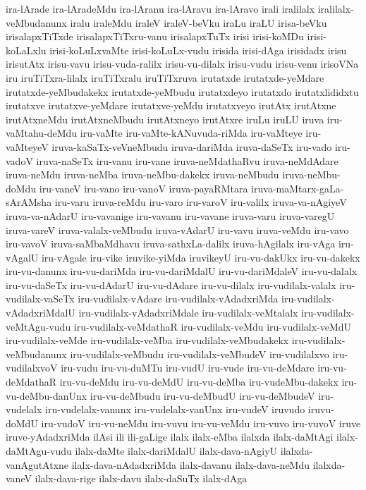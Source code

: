 {ira-lArade
ira-lAradeMdu
ira-lAranu
ira-lAravu
ira-lAravo
irali
iralilalx
iralilalx-veMbudanunx
iralu
iraleMdu
iraleV
iraleV-beVku
iraLu
iraLU
irisa-beVku
irisalapxTiTxde
irisalapxTiTxru-vanu
irisalapxTuTx
irisi
irisi-koMDu
irisi-koLaLxlu
irisi-koLuLxvaMte
irisi-koLuLx-vudu
irisida
irisi-dAga
irisidadx
irisu
irisutAtx
irisu-vavu
irisu-vuda-ralilx
irisu-vu-dilalx
irisu-vudu
irisu-venu
irisoVNa
iru
iruTiTxra-lilalx
iruTiTxralu
iruTiTxruva
irutatxde
irutatxde-yeMdare
irutatxde-yeMbudakekx
irutatxde-yeMbudu
irutatxdeyo
irutatxdo
irutatxlididxtu
irutatxve
irutatxve-yeMdare
irutatxve-yeMdu
irutatxveyo
irutAtx
irutAtxne
irutAtxneMdu
irutAtxneMbudu
irutAtxneyo
irutAtxre
iruLu
iruLU
iruva
iru-vaMtahu-deMdu
iru-vaMte
iru-vaMte-kANuvuda-riMda
iru-vaMteye
iru-vaMteyeV
iruva-kaSaTx-veVneMbudu
iruva-dariMda
iruva-daSeTx
iru-vado
iru-vadoV
iruva-naSeTx
iru-vanu
iru-vane
iruva-neMdathaRvu
iruva-neMdAdare
iruva-neMdu
iruva-neMba
iruva-neMbu-dakekx
iruva-neMbudu
iruva-neMbu-doMdu
iru-vaneV
iru-vano
iru-vanoV
iruva-payaRMtara
iruva-maMtarx-gaLa-sArAMsha
iru-varu
iruva-reMdu
iru-varo
iru-varoV
iru-valilx
iruva-va-nAgiyeV
iruva-va-nAdarU
iru-vavanige
iru-vavanu
iru-vavane
iruva-varu
iruva-varegU
iruva-vareV
iruva-valalx-veMbudu
iruva-vAdarU
iru-vavu
iruva-veMdu
iru-vavo
iru-vavoV
iruva-saMbaMdhavu
iruva-sathxLa-dalilx
iruva-hAgilalx
iru-vAga
iru-vAgalU
iru-vAgale
iru-vike
iruvike-yiMda
iruvikeyU
iru-vu-dakUkx
iru-vu-dakekx
iru-vu-danunx
iru-vu-dariMda
iru-vu-dariMdalU
iru-vu-dariMdaleV
iru-vu-dalalx
iru-vu-daSeTx
iru-vu-dAdarU
iru-vu-dAdare
iru-vu-dilalx
iru-vudilalx-valalx
iru-vudilalx-vaSeTx
iru-vudilalx-vAdare
iru-vudilalx-vAdadxriMda
iru-vudilalx-vAdadxriMdalU
iru-vudilalx-vAdadxriMdale
iru-vudilalx-veMtalalx
iru-vudilalx-veMtAgu-vudu
iru-vudilalx-veMdathaR
iru-vudilalx-veMdu
iru-vudilalx-veMdU
iru-vudilalx-veMde
iru-vudilalx-veMba
iru-vudilalx-veMbudakekx
iru-vudilalx-veMbudanunx
iru-vudilalx-veMbudu
iru-vudilalx-veMbudeV
iru-vudilalxvo
iru-vudilalxvoV
iru-vudu
iru-vu-duMTu
iru-vudU
iru-vude
iru-vu-deMdare
iru-vu-deMdathaR
iru-vu-deMdu
iru-vu-deMdU
iru-vu-deMba
iru-vudeMbu-dakekx
iru-vu-deMbu-danUnx
iru-vu-deMbudu
iru-vu-deMbudU
iru-vu-deMbudeV
iru-vudelalx
iru-vudelalx-vanunx
iru-vudelalx-vanUnx
iru-vudeV
iruvudo
iruvu-doMdU
iru-vudoV
iru-vu-neMdu
iru-vuvu
iru-vu-veMdu
iru-vuvo
iru-vuvoV
iruve
iruve-yAdadxriMda
ilAsi
ili
ili-gaLige
ilalx
ilalx-eMba
ilalxda
ilalx-daMtAgi
ilalx-daMtAgu-vudu
ilalx-daMte
ilalx-dariMdalU
ilalx-dava-nAgiyU
ilalxda-vanAgutAtxne
ilalx-dava-nAdadxriMda
ilalx-davanu
ilalx-dava-neMdu
ilalxda-vaneV
ilalx-dava-rige
ilalx-davu
ilalx-daSuTx
ilalx-dAga
}
